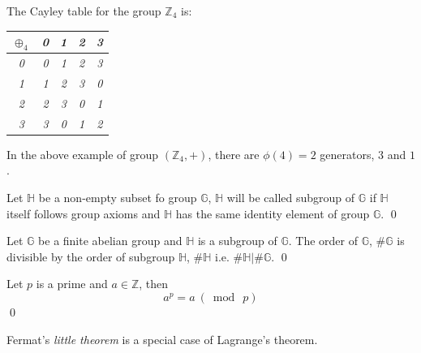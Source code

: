 \begin{example} \label{example_Cayleytable}
	The Cayley table for the group $\mathbb{Z}_4$ is:
	\begin{center}
		\begin{tabular}{c|cccc}
			$\oplus_4$&\em 0&\em 1&\em 2&\em 3       \\
			\hline
			\em 0&\em 0&\em 1&\em 2&\em 3       \\
			\em 1&\em 1&\em 2&\em 3&\em 0       \\
			\em 2&\em 2&\em 3&\em 0&\em 1       \\
			\em 3&\em 3&\em 0&\em 1&\em 2       \\
		\end{tabular}
	\end{center}
\end{example}
In the above example of group $(\mathbb{Z}_4,+)$, there are $\phi(4)=2$ generators, $3$ and $1$.

\begin{definition}
	Let $\mathbb{H}$ be  a non-empty subset  fo group $\mathbb{G}$, $\mathbb{H}$  will be called subgroup of $\mathbb{G}$ if  $\mathbb{H}$  itself follows group axioms and $\mathbb{H}$ has the same identity element of group $\mathbb{G}$. 
	\qed
\end{definition}

\begin{theorem}
	Let $\mathbb{G}$ be a finite abelian group and $\mathbb{H}$ is a subgroup of $\mathbb{G}$.  The order of $\mathbb{G}$, $\#\mathbb{G}$ is divisible by the order of subgroup $\mathbb{H}$, $\#\mathbb{H}$ i.e.   $\#\mathbb{H} | \#\mathbb{G}$.
\qed
\end{theorem}

\begin{theorem}
	Let $p$ is a prime and $a \in \mathbb{Z}$, then $$a^p = a ~(\bmod ~p)$$
	\qed
\end{theorem}
Fermat’s \textit{little theorem} is a special case of Lagrange’s theorem.


